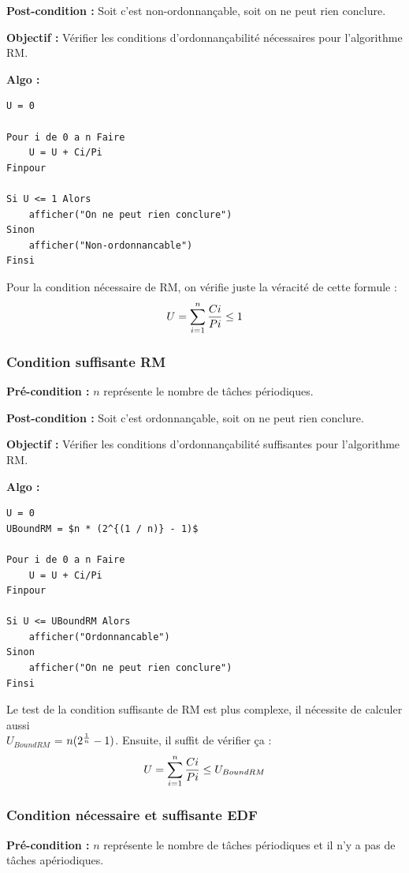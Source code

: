 				\textbf{Post-condition :} Soit c'est non-ordonnançable, soit on ne peut rien conclure.
				
				\textbf{Objectif :} Vérifier les conditions d'ordonnançabilité nécessaires pour l'algorithme RM.
				
				\textbf{Algo :} 
					\begin{lstlisting}
U = 0

Pour i de 0 a n Faire
	U = U + Ci/Pi
Finpour		

Si U <= 1 Alors
	afficher("On ne peut rien conclure")
Sinon
	afficher("Non-ordonnancable")
Finsi
					\end{lstlisting}
					
					Pour la condition nécessaire de RM, on vérifie juste la véracité de cette formule : \[ U = \sum_{i=1}^{n} {Ci \over Pi}  \le 1 \]
			
			\subsubsection{Condition suffisante RM}
				\textbf{Pré-condition :} $n$ représente le nombre de tâches périodiques.
				
				\textbf{Post-condition :} Soit c'est ordonnançable, soit on ne peut rien conclure.
				
				\textbf{Objectif :} Vérifier les conditions d'ordonnançabilité suffisantes pour l'algorithme RM.
				
				\textbf{Algo :} 
					\begin{lstlisting}[mathescape]
U = 0
UBoundRM = $n * (2^{(1 / n)} - 1)$
					
Pour i de 0 a n Faire
	U = U + Ci/Pi
Finpour

Si U <= UBoundRM Alors
	afficher("Ordonnancable")
Sinon
	afficher("On ne peut rien conclure")
Finsi
					\end{lstlisting}
					
					Le test de la condition suffisante de RM est plus complexe, il nécessite de calculer aussi \\ $U_{BoundRM}$ = $n (2^{1 \over n} - 1)$. Ensuite, il suffit de vérifier ça : \[ U = \sum_{i=1}^{n} {Ci \over Pi}  \le U_{BoundRM} \]
			
			\subsubsection{Condition nécessaire et suffisante EDF}
				\textbf{Pré-condition :} $n$ représente le nombre de tâches périodiques et il n'y a pas de tâches apériodiques.
				
